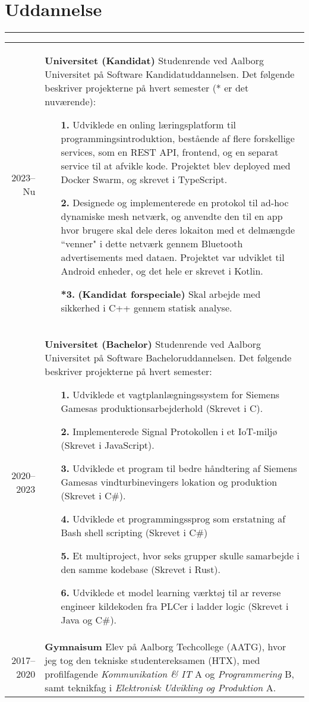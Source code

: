 \documentclass[a4paper]{report}
\def\secsep{\hrule width5cm}
\begin{document}
\newcommand{\p}[1]{\textbf{#1}\mbox{}\newline}
\def\n{\\\\}
\section*{Uddannelse}
\secsep
\begin{longtabu} to \textwidth {r|X}
    2023--Nu & \p{Universitet (Kandidat)}
    Studenrende ved Aalborg Universitet på Software Kandidatuddannelsen. Det følgende beskriver projekterne på hvert semester (* er det nuværende):
    \begin{itemize}[leftmargin=4em]
        \item[\textbf{1.}] Udviklede en onling læringsplatform til programmingsintroduktion, bestående af flere forskellige services, som en REST API, frontend, og en separat service til at afvikle kode.
            Projektet blev deployed med Docker Swarm, og skrevet i TypeScript.
        \item[\textbf{2.}] Designede  og implementerede en protokol til ad-hoc dynamiske mesh netværk, og anvendte den til en app hvor brugere skal dele deres lokaiton med et delmængde ``venner" i dette netværk gennem Bluetooth advertisements med dataen. Projektet var udviklet til Android enheder, og det hele er skrevet i Kotlin.
        \item[\textbf{*3.}] \textbf{(Kandidat forspeciale)} Skal arbejde med sikkerhed i C++ gennem statisk analyse.
    \end{itemize}
    \\
    2020--2023 & \p{Universitet (Bachelor)}
    Studenrende ved Aalborg Universitet på Software Bacheloruddannelsen. Det følgende beskriver projekterne på hvert semester:
    \begin{itemize}[leftmargin=4em]
        \item[\textbf{1.}] Udviklede et vagtplanlægningssystem for Siemens Gamesas produktionsarbejderhold (Skrevet i C).
        \item[\textbf{2.}] Implementerede Signal Protokollen i et IoT-miljø (Skrevet i JavaScript).
        \item[\textbf{3.}] Udviklede et program til bedre håndtering af Siemens Gamesas vindturbinevingers lokation og produktion (Skrevet i C\#).
        \item[\textbf{4.}] Udviklede et programmingssprog som erstatning af Bash shell scripting (Skrevet i C\#)
        \item[\textbf{5.}] Et multiproject, hvor seks grupper skulle samarbejde i den samme kodebase (Skrevet i Rust).
        \item[\textbf{6.}] Udviklede et model learning værktøj til ar reverse engineer kildekoden fra PLCer i ladder logic (Skrevet i Java og C\#).
    \end{itemize}
    \\
    2017--2020 & \p{Gymnaisum} 
    Elev på Aalborg Techcollege (AATG), hvor jeg tog den tekniske studentereksamen (HTX),
    med profilfagende \textit{Kommunikation \& IT} A og \textit{Programmering} B,
    samt teknikfag i \textit{Elektronisk Udvikling og Produktion} A.
\end{longtabu}
\end{document}
